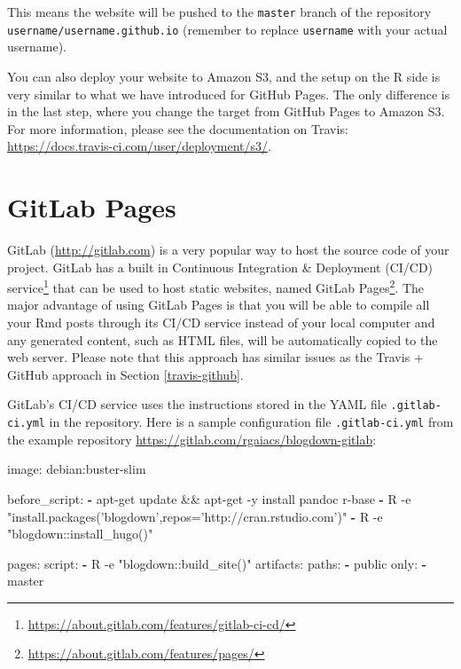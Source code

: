 \documentclass[12pt,]{krantz}
\makeatletter
\newenvironment{Shaded}{\begin{snugshade}}{\end{snugshade}}
\newcommand{\AttributeTok}[1]{\textcolor[rgb]{0.77,0.63,0.00}{#1}}
\newcommand{\FunctionTok}[1]{\textcolor[rgb]{0.00,0.00,0.00}{#1}}
\newcommand{\KeywordTok}[1]{\textcolor[rgb]{0.13,0.29,0.53}{\textbf{#1}}}
\newcommand{\NormalTok}[1]{#1}
\renewcommand{\href}[2]{#2\footnote{\url{#1}}}
\newenvironment{kframe}{%
\medskip{}
\setlength{\fboxsep}{.8em}
 \def\at@end@of@kframe{}%
 \ifinner\ifhmode%
  \def\at@end@of@kframe{\end{minipage}}%
  \begin{minipage}{\columnwidth}%
 \fi\fi%
 \def\FrameCommand##1{\hskip\@totalleftmargin \hskip-\fboxsep
 \colorbox{shadecolor}{##1}\hskip-\fboxsep
     \hskip-\linewidth \hskip-\@totalleftmargin \hskip\columnwidth}%
 \MakeFramed {\advance\hsize-\width
   \@totalleftmargin\z@ \linewidth\hsize
   \@setminipage}}%
 {\par\unskip\endMakeFramed%
 \at@end@of@kframe}
\renewenvironment{Shaded}{\begin{kframe}}{\end{kframe}}
\theoremstyle{definition}
\theoremstyle{definition}
\theoremstyle{definition}
\theoremstyle{remark}
\makeatother
\begin{document}
This means the website will be pushed to the \texttt{master} branch of
the repository \texttt{username/username.github.io} (remember to replace
\texttt{username} with your actual username).

You can also deploy your website to Amazon S3, and the
setup on the R side is very similar to what we have introduced for
GitHub Pages. The only difference is in the last step, where you change
the target from GitHub Pages to Amazon S3. For more information, please
see the documentation on Travis:
\url{https://docs.travis-ci.com/user/deployment/s3/}.

\hypertarget{gitlab-pages}{%
\section{GitLab Pages}\label{gitlab-pages}}

GitLab (\url{http://gitlab.com}) is a very popular way to host the
source code of your project. GitLab has a
\href{https://about.gitlab.com/features/gitlab-ci-cd/}{built in
Continuous Integration \& Deployment (CI/CD) service} that can be used
to host static websites, named
\href{https://about.gitlab.com/features/pages/}{GitLab Pages}. The major
advantage of using GitLab Pages is that you will be able to compile all
your Rmd posts through its CI/CD service instead of your local computer
and any generated content, such as HTML files, will be automatically
copied to the web server. Please note that this approach has similar
issues as the Travis + GitHub approach in Section \ref{travis-github}.

GitLab's CI/CD service uses the instructions stored in the YAML file
\texttt{.gitlab-ci.yml} in the repository. Here is a sample
configuration file \texttt{.gitlab-ci.yml} from the example repository
\url{https://gitlab.com/rgaiacs/blogdown-gitlab}:

\begin{Shaded}
\begin{Highlighting}[]
\FunctionTok{image:}\AttributeTok{ debian:buster-slim}

\FunctionTok{before_script:}
  \KeywordTok{-}\NormalTok{ apt-get update && apt-get -y install pandoc r-base}
  \KeywordTok{-} \FunctionTok{R -e "install.packages('blogdown',repos='http:}\AttributeTok{//cran.rstudio.com')"}
  \KeywordTok{-} \FunctionTok{R -e "blogdown:}\AttributeTok{:install_hugo()"}

\FunctionTok{pages:}
  \FunctionTok{script:}
    \KeywordTok{-} \FunctionTok{R -e "blogdown:}\AttributeTok{:build_site()"}
  \FunctionTok{artifacts:}
    \FunctionTok{paths:}
      \KeywordTok{-}\NormalTok{ public}
  \FunctionTok{only:}
    \KeywordTok{-}\NormalTok{ master}
\end{Highlighting}
\end{Shaded}
\end{document}
